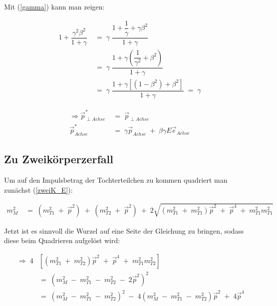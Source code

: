 \documentclass[
a4paper,                                %
twoside,                                %
BCOR1.4cm,                      %
ngerman,                                %
10pt,                           %
headings=normal,                %
headsepline,                    %
clearplainpage, %
final,                                  %
div=14,
parskip=full
]{scrbook}
\begin{document}
Mit (\ref{gamma}) kann man zeigen:

\begin{align}
	1 + \dfrac{\gamma^{2} \beta^{2} }{1 + \gamma}
\;&=\;
	\gamma\;\dfrac{1 + \dfrac{1}{\gamma} + \gamma \beta^{2}}{1 + \gamma}
\nonumber
\\	
\;&=\;
	\gamma\;
	\dfrac{1 + \gamma \left(\dfrac{1}{\gamma^{2}} + \beta^{2}\right)}
	{1 + \gamma}	
\nonumber
\\
\;&=\;
	\gamma\;
	\dfrac{1 + \gamma \left[\left(1 - \beta^{2}\right) + \beta^{2}\right]}
	{1 + \gamma}		
\;=\;\gamma
\label{gamma_rel1}
\end{align}

\begin{align}
\Rightarrow
	\vec{p}^{*}_{\perp Achse}
\;&=\;
	\vec{p}_{\perp Achse}
\nonumber
\\
	\vec{p}^{*}_{Achse}
\;&=\;
	\gamma \vec{p}_{Achse}
	\;+\;
	\beta \gamma E \vec{e}_{Achse}
\end{align}

\subsection{Zu Zweik\"orperzerfall}\label{anhangzweikoerper}

Um auf den Impulsbetrag der Tochterteilchen zu kommen quadriert man zun\"achst (\ref{zweiK_E}):

\begin{align}
	m_{M}^{2}
\;&=\;
	\left(m_{T1}^{2}\;+\;\vec{p}^{2}\right)\;+\;
	\left(m_{T2}^{2}\;+\;\vec{p}^{2}\right)
\;+\;
	2\sqrt{
		\left(
			m_{T1}^{2}\;+\;
			m_{T1}^{2}
		\right)\vec{p}^{2}
		\;+\;\vec{p}^{4}\;+\;
		m_{T1}^{2}
		m_{T1}^{2}
	}
\nonumber
\end{align}

Jetzt ist es sinnvoll die Wurzel auf eine Seite der Gleichung zu bringen, sodass diese beim Quadrieren aufgel\"ost wird:

\begin{align}
\;\Rightarrow\;
4 &\left[
		\left(
			m_{T1}^{2}\;+\;m_{T2}^{2}
		\right) \vec{p}^{2}
		\;+\;\vec{p}^{4}
		\;+\;m_{T1}^{2} m_{T2}^{2}
	\right]
\nonumber
\\
\;&=\;
	\left(
		m_{M}^{2}\;-\;m_{T1}^{2}\;-\;m_{T2}^{2}
		\;-\;2\vec{p}^{2}
	\right)^{2}
\nonumber
\\
\;&=\;
	\left(m_{M}^{2}\;-\;m_{T1}^{2}\;-\;m_{T2}^{2}\right)^{2}
\;-\;
	4 \left(m_{M}^{2}\;-\;m_{T1}^{2}\;-\;m_{T2}^{2}\right)
	\vec{p}^{2} 
	\;+\;
	4 \vec{p}^{4}
\nonumber
\end{align}
\end{document}
